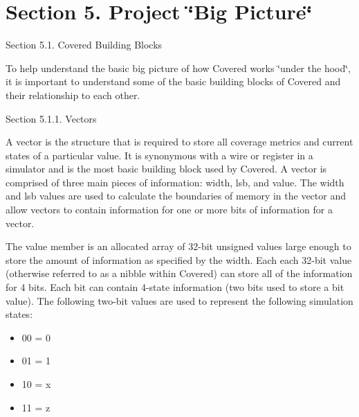 \section{Section 5.  Project \char`\"{}Big Picture\char`\"{}}\label{page_big_picture}
\begin{Desc}
\item[Section 5.1. Covered Building Blocks]\end{Desc}
\begin{Desc}
\item[]To help understand the basic big picture of how Covered works \char`\"{}under the hood\char`\"{}, it is important to understand some of the basic building blocks of Covered and their relationship to each other.\end{Desc}
\begin{Desc}
\item[Section 5.1.1. Vectors]\end{Desc}
\begin{Desc}
\item[]A vector is the structure that is required to store all coverage metrics and current states of a particular value. It is synonymous with a wire or register in a simulator and is the most basic building block used by Covered. A vector is comprised of three main pieces of information: width, lsb, and value. The width and lsb values are used to calculate the boundaries of memory in the vector and allow vectors to contain information for one or more bits of information for a vector.\end{Desc}
\begin{Desc}
\item[]The value member is an allocated array of 32-bit unsigned values large enough to store the amount of information as specified by the width. Each each 32-bit value (otherwise referred to as a nibble within Covered) can store all of the information for 4 bits. Each bit can contain 4-state information (two bits used to store a bit value). The following two-bit values are used to represent the following simulation states:\end{Desc}
\begin{Desc}
\item[]\begin{itemize}
\item 00 = 0 \item 01 = 1 \item 10 = x \item 11 = z \end{itemize}
\end{Desc}
